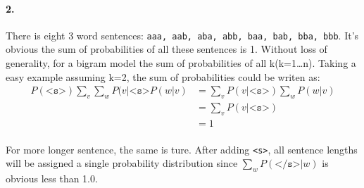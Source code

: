 \documentclass{article}
\begin{document}
\paragraph{2.}
There is eight 3 word sentences: \texttt{aaa, aab, aba, abb, baa, bab, bba, bbb}.
It's obvious the sum of probabilities of all these sentences is 1.
Without loss of generality, for a bigram model the sum of probabilities of all k(k=1\dots n).
Taking a easy example assuming k=2, the sum of probabilities could be writen as:
\begin{align*}
    P(\texttt{<s>})\sum_v \sum_w P(v|\texttt{<s>} P(w|v) & = \sum_v P(v|\texttt{<s>}) \sum_w P(w|v) \\
                                                         & = \sum_v P(v|\texttt{<s>})               \\
                                                         & = 1
\end{align*}
\paragraph{}
For more longer sentence, the same is ture. After adding \texttt{<s>}, all sentence lengths will be assigned
a single probability distribution since $\sum_w P(\texttt{</s>}|w)$ is obvious less than 1.0.
\end{document}
